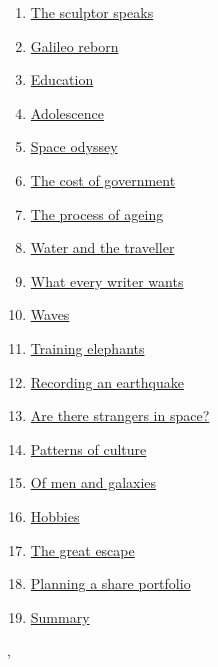 \documentclass[11pt]{article}
\renewcommand{\today}{\shortmonthname[\the\month] \the \day,  \the\year}
\begin{document}
\begin{multicols}{2}
\begin{enumerate}
		\item \href{URL}{The sculptor speaks}	%
		\item \href{URL}{Galileo reborn}	%
		\item \href{URL}{Education}	%
		\item \href{URL}{Adolescence}	%
		\item \href{URL}{Space odyssey}	%
		\item \href{URL}{The cost of government}	%
		\item \href{URL}{The process of ageing}	%
		\item \href{URL}{Water and the traveller}	%
		\item \href{URL}{What every writer wants}	%
		\item \href{URL}{Waves}	%
		\item \href{URL}{Training elephants}	%
		\item \href{URL}{Recording an earthquake}	%
		\item \href{URL}{Are there strangers in space?}	%
		\item \href{URL}{Patterns of culture}	%
		\item \href{URL}{Of men and galaxies}	%
		\item \href{URL}{Hobbies}	%
		\item \href{URL}{The great escape}	%
		\item \href{URL}{Planning a share portfolio}	%
		\item \href{URL}{Summary}	%
	\end{enumerate}
\end{multicols}


%
\begin{flushright}
	\tiny \today 
\end{flushright}
\end{document}
